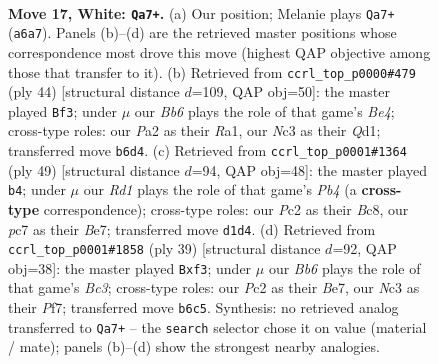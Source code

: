 \documentclass[11pt]{article}
\begin{document}
\clearpage

\begin{figure}[p]\centering
\begin{subfigure}{0.46\textwidth}\centering
\resizebox{\linewidth}{!}{%
\newchessgame
\chessboard[
  setfen={1k1r3r/2p1bppp/QBbpqn2/8/1P2P1P1/2N2P2/P1P4P/2KR1B1R w - - 1 17},
  showmover=false,
  pgfstyle=straightmove, color=movearrow, markmove={a6-a7}
]}
\caption{}
\end{subfigure}\hfill
\begin{subfigure}{0.46\textwidth}\centering
\resizebox{\linewidth}{!}{%
\newchessgame
\chessboard[
  setfen={1rb2rk1/p3p1bp/n3P3/2p1qp2/P1P1B3/2N4P/1P4P1/R2QBRK1 w - - 0 23},
  showmover=false,
  pgfstyle=straightmove, color=movearrow, markmove={e4-f3}
]}
\caption{}
\end{subfigure}
\\[4pt]
\begin{subfigure}{0.46\textwidth}\centering
\resizebox{\linewidth}{!}{%
\newchessgame
\chessboard[
  setfen={1rb2r1k/p3b1p1/2q1p1Bp/1p1n2NQ/3p1P2/P7/1PP1N1PP/R4R1K b - - 1 25},
  showmover=false,
  pgfstyle=straightmove, color=movearrow, markmove={b5-b4}
]}
\caption{}
\end{subfigure}\hfill
\begin{subfigure}{0.46\textwidth}\centering
\resizebox{\linewidth}{!}{%
\newchessgame
\chessboard[
  setfen={1r2k3/4bp1p/pqbpppr1/n7/5PPB/P1Q2N1P/1PP1B3/1K1R3R b - - 2 20},
  showmover=false,
  pgfstyle=straightmove, color=movearrow, markmove={c6-f3}
]}
\caption{}
\end{subfigure}
\caption{\textbf{Move 17, White: \texttt{Qa7+}.} (a) Our position; Melanie plays \texttt{Qa7+} (\texttt{a6a7}). Panels (b)--(d) are the retrieved master positions whose correspondence most drove this move (highest QAP objective among those that transfer to it). (b) Retrieved from \texttt{ccrl\_top\_p0000\#479} (ply 44) [structural distance $d$=109, QAP obj=50]: the master played \texttt{Bf3}; under $\mu$ our \emph{Bb6} plays the role of that game's \emph{Be4}; cross-type roles: our \emph{P}a2 as their \emph{R}a1, our \emph{N}c3 as their \emph{Q}d1; transferred move \texttt{b6d4}. (c) Retrieved from \texttt{ccrl\_top\_p0001\#1364} (ply 49) [structural distance $d$=94, QAP obj=48]: the master played \texttt{b4}; under $\mu$ our \emph{Rd1} plays the role of that game's \emph{Pb4} (a \textbf{cross-type} correspondence); cross-type roles: our \emph{P}c2 as their \emph{B}c8, our \emph{p}c7 as their \emph{B}e7; transferred move \texttt{d1d4}. (d) Retrieved from \texttt{ccrl\_top\_p0001\#1858} (ply 39) [structural distance $d$=92, QAP obj=38]: the master played \texttt{Bxf3}; under $\mu$ our \emph{Bb6} plays the role of that game's \emph{Bc3}; cross-type roles: our \emph{P}c2 as their \emph{B}e7, our \emph{N}c3 as their \emph{P}f7; transferred move \texttt{b6c5}. Synthesis: no retrieved analog transferred to \texttt{Qa7+} -- the \texttt{search} selector chose it on value (material / mate); panels (b)--(d) show the strongest nearby analogies.}
\label{fig:thought-m32}
\end{figure}
\end{document}

